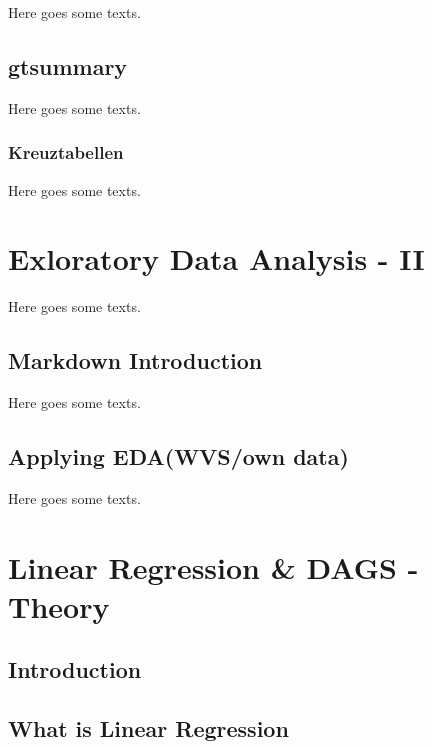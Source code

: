 \documentclass[
]{book}
\begin{document}
Here goes some texts.

\hypertarget{gtsummary}{%
\section{gtsummary}\label{gtsummary}}

Here goes some texts.

\hypertarget{kreuztabellen}{%
\subsection{Kreuztabellen}\label{kreuztabellen}}

Here goes some texts.

\hypertarget{eda-2}{%
\chapter{Exloratory Data Analysis - II}\label{eda-2}}

Here goes some texts.

\hypertarget{markdown-introduction}{%
\section{Markdown Introduction}\label{markdown-introduction}}

Here goes some texts.

\hypertarget{applying-edawvsown-data}{%
\section{Applying EDA(WVS/own data)}\label{applying-edawvsown-data}}

Here goes some texts.

\hypertarget{lin-t}{%
\chapter{Linear Regression \& DAGS - Theory}\label{lin-t}}

\hypertarget{introduction}{%
\section{Introduction}\label{introduction}}

\hypertarget{what-is-linear-regression}{%
\section{What is Linear Regression}\label{what-is-linear-regression}}
\end{document}
